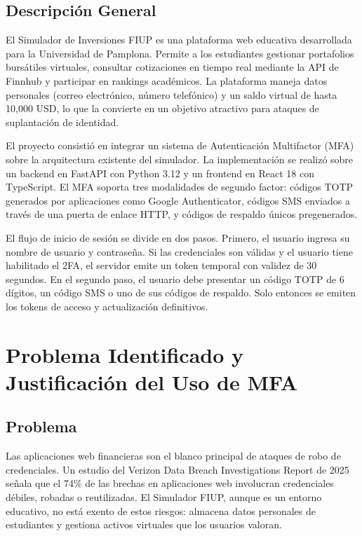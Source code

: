 \documentclass[12pt,letterpaper]{article}
\begin{document}
\subsection{Descripci\'on General}

El Simulador de Inversiones FIUP es una plataforma web educativa desarrollada para la Universidad de Pamplona. Permite a los estudiantes gestionar portafolios burs\'atiles virtuales, consultar cotizaciones en tiempo real mediante la API de Finnhub y participar en rankings acad\'emicos. La plataforma maneja datos personales (correo electr\'onico, n\'umero telef\'onico) y un saldo virtual de hasta 10,000 USD, lo que la convierte en un objetivo atractivo para ataques de suplantaci\'on de identidad.

El proyecto consisti\'o en integrar un sistema de Autenticaci\'on Multifactor (MFA) sobre la arquitectura existente del simulador. La implementaci\'on se realiz\'o sobre un backend en FastAPI con Python 3.12 y un frontend en React 18 con TypeScript. El MFA soporta tres modalidades de segundo factor: c\'odigos TOTP generados por aplicaciones como Google Authenticator, c\'odigos SMS enviados a trav\'es de una puerta de enlace HTTP, y c\'odigos de respaldo \'unicos pregenerados.

El flujo de inicio de sesi\'on se divide en dos pasos. Primero, el usuario ingresa su nombre de usuario y contrase\~na. Si las credenciales son v\'alidas y el usuario tiene habilitado el 2FA, el servidor emite un token temporal con validez de 30 segundos. En el segundo paso, el usuario debe presentar un c\'odigo TOTP de 6 d\'igitos, un c\'odigo SMS o uno de sus c\'odigos de respaldo. Solo entonces se emiten los tokens de acceso y actualizaci\'on definitivos.

\section{Problema Identificado y Justificaci\'on del Uso de MFA}

\subsection{Problema}

Las aplicaciones web financieras son el blanco principal de ataques de robo de credenciales. Un estudio del Verizon Data Breach Investigations Report de 2025 se\~nala que el 74\% de las brechas en aplicaciones web involucran credenciales d\'ebiles, robadas o reutilizadas. El Simulador FIUP, aunque es un entorno educativo, no est\'a exento de estos riesgos: almacena datos personales de estudiantes y gestiona activos virtuales que los usuarios valoran.
\end{document}
